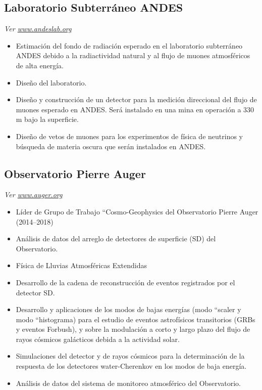 \subsection*{Laboratorio Subterráneo ANDES}
{\small{\textit{Ver \href{http://www.andeslab.org}{www.andeslab.org}}}}
\begin{itemize}
\item Estimación del fondo de radiación esperado en el laboratorio subterráneo ANDES debido a la radiactividad natural y al flujo de muones atmosféricos de alta energía.
\item Diseño del laboratorio.
\item Diseño y construcción de un detector para la medición direccional del flujo de muones esperado en ANDES. Será instalado en una mina en operación a 330 m bajo la superficie.
\item Diseño de vetos de muones para los experimentos de física de neutrinos y búsqueda de materia oscura que serán instalados en ANDES\@.
\end{itemize}

\subsection*{Observatorio Pierre Auger}
{\small{\textit{Ver \href{http://www.auger.org/}{www.auger.org}}}}
\begin{itemize}
\item Líder de Grupo de Trabajo ``Cosmo-Geophysics del Observatorio Pierre Auger (2014--2018)
\item Análisis de datos del arreglo de detectores de superficie (SD) del Observatorio.
\item Física de Lluvias Atmosféricas Extendidas
\item Desarrollo de la cadena de reconstrucción de eventos registrados por el detector SD\@.
\item Desarrollo y aplicaciones de los modos de bajas energías (modo ``scaler y modo ``histograma) para el estudio de eventos astrofísicos transitorios (GRBs y eventos Forbush), y sobre la modulación a corto y largo plazo del flujo de rayos cósmicos galácticos debida a la actividad solar.
\item Simulaciones del detector y de rayos cósmicos para la determinación de la respuesta de los detectores water-Cherenkov en los modos de baja energía.
\item Análisis de datos del sistema de monitoreo atmosférico del Observatorio.
\end{itemize}
